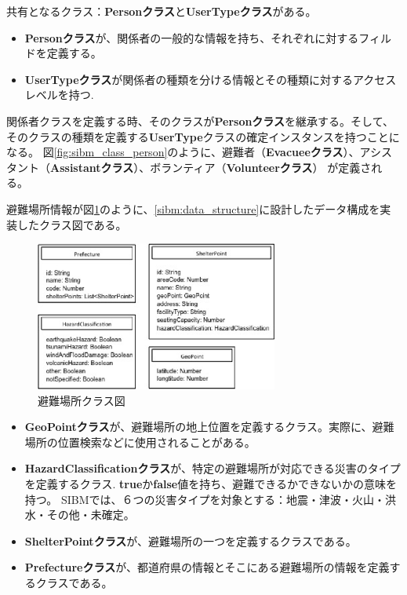 共有となるクラス：\textbf{Personクラス}と\textbf{UserTypeクラス}がある。

\begin{itemize}
  \item \textbf{Personクラス}が、関係者の一般的な情報を持ち、それぞれに対するフィルドを定義する。
  \item \textbf{UserTypeクラス}が関係者の種類を分ける情報とその種類に対するアクセスレベルを持つ.
\end{itemize}

関係者クラスを定義する時、そのクラスが\textbf{Personクラス}を継承する。そして、そのクラスの種類を定義する\textbf{UserType}クラスの確定インスタンスを持つことになる。
図\ref{fig:sibm_class_person}のように、避難者（\textbf{Evacueeクラス}）、アシスタント（\textbf{Assistantクラス}）、ボランティア（\textbf{Volunteerクラス}）
が定義される。

避難場所情報が図\ref{fig:sibm_class_shelter}のように、\ref{sibm:data_structure}に設計したデータ構成を実装したクラス図である。

\begin{figure}[h!]
 	\begin{center}
 		\includegraphics[width=80mm]{./images/class_shelter.eps}
 		\caption{避難場所クラス図}
 		\label{fig:sibm_class_shelter}
 	\end{center}
\end{figure}

\begin{itemize}
  \item \textbf{GeoPointクラス}が、避難場所の地上位置を定義するクラス。実際に、避難場所の位置検索などに使用されることがある。
  \item
  \textbf{HazardClassificationクラス}が、特定の避難場所が対応できる災害のタイプを定義するクラス.
  \textbf{true}か\textbf{false}値を持ち、避難できるかできないかの意味を持つ。
  SIBMでは、６つの災害タイプを対象とする：地震・津波・火山・洪水・その他・未確定。
  \item \textbf{ShelterPointクラス}が、避難場所の一つを定義するクラスである。
  \item \textbf{Prefectureクラス}が、都道府県の情報とそこにある避難場所の情報を定義するクラスである。
\end{itemize}


